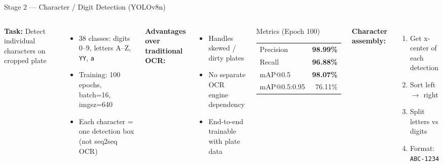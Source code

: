 \documentclass[aspectratio=169,11pt]{beamer}
\begin{document}
\begin{frame}{Stage 2 --- Character / Digit Detection (YOLOv8n)}
  \begin{columns}[T]
    \textbf{Task:} Detect individual characters on cropped plate
    \begin{itemize}
      \item 38 classes: digits 0--9, letters A--Z, \texttt{YY}, \texttt{a}
      \item Training: 100 epochs, batch=16, imgsz=640
      \item Each character = one detection box (not seq2seq OCR)
    \end{itemize}
    \textbf{Advantages over traditional OCR:}
    \begin{itemize}
      \item Handles skewed / dirty plates
      \item No separate OCR engine dependency
      \item End-to-end trainable with plate data
    \end{itemize}
    \begin{block}{Metrics (Epoch 100)}
      \begin{tabular}{@{}lr@{}}
        Precision & \textbf{98.99\%} \\
        Recall    & \textbf{96.88\%} \\
        mAP@0.5   & \textbf{98.07\%} \\
        mAP@0.5:0.95 & 76.11\% \\
      \end{tabular}
    \end{block}
    \textbf{Character assembly:}
    \begin{enumerate}
      \item Get x-center of each detection
      \item Sort left $\rightarrow$ right
      \item Split letters vs digits
      \item Format: \texttt{ABC-1234}
    \end{enumerate}
  \end{columns}
\end{frame}
\end{document}
